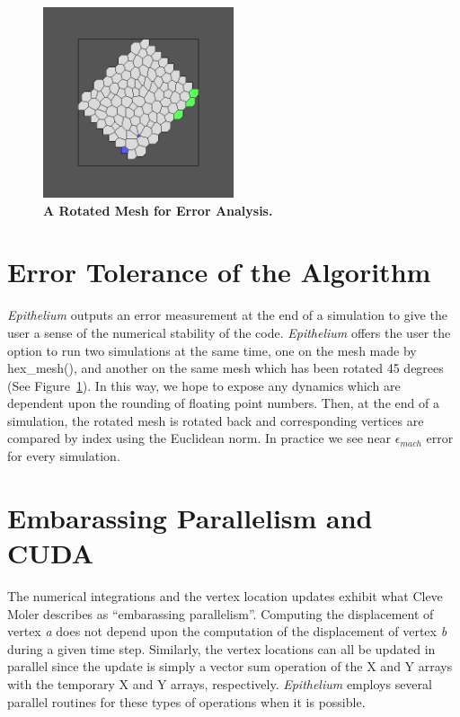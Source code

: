 \begin{figure}[hr]
\centering
\includegraphics[width=0.5\textwidth]{../diagrams/rotate.png}
\caption{\textbf{A Rotated Mesh for Error Analysis.}}
\label{fig:rotate}
\end{figure}

\section{Error Tolerance of the Algorithm}
\emph{Epithelium} outputs an error measurement at the end of a simulation to give the user a sense of the numerical stability of the code. \emph{Epithelium} offers the user the option to run two simulations at the same time, one on the mesh made by hex\_mesh(), and another on the same mesh which has been rotated 45 degrees (See Figure~\ref{fig:rotate}). In this way, we hope to expose any dynamics which are dependent upon the rounding of floating point numbers. Then, at the end of a simulation, the rotated mesh is rotated back and corresponding vertices are compared by index using the Euclidean norm. In practice we see near $\epsilon_{mach}$ error for every simulation.

\section{Embarassing Parallelism and CUDA}
The numerical integrations and the vertex location updates exhibit what Cleve Moler describes as ``embarassing parallelism''. Computing the displacement of vertex \emph{a} does not depend upon the computation of the displacement of vertex \emph{b} during a given time step. Similarly, the vertex locations can all be updated in parallel since the update is simply a vector sum operation of the X and Y arrays with the temporary X and Y arrays, respectively. \emph{Epithelium} employs several parallel routines for these types of operations when it is possible. 

